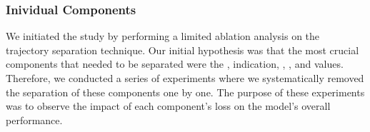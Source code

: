 \subsubsection{Inividual Components}
\label{subsec:individual-components}

\noindent We initiated the study by performing a limited ablation analysis on the trajectory separation technique. Our initial hypothesis was that the most crucial components that needed to be separated were the ,  indication, , , and  values. Therefore, we conducted a series of experiments where we systematically removed the separation of these components one by one. The purpose of these experiments was to observe the impact of each component's loss on the model's overall performance.

\bigskip

